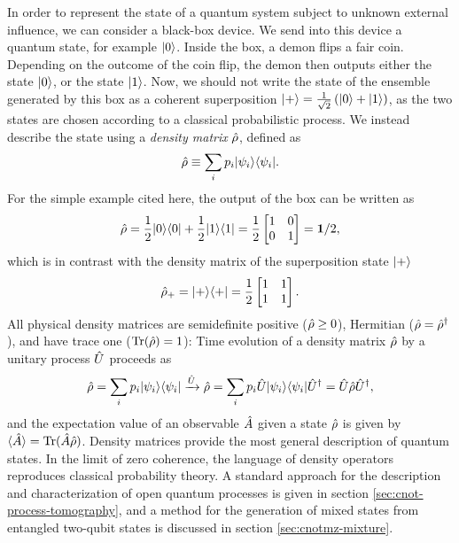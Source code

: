 In order to represent the state of a quantum system subject to unknown external influence, we can consider a black-box device. We send into this device a quantum state, for example $\mbox{$ | 0 \rangle $}$. Inside the box, a demon flips a fair coin. Depending on the outcome of the coin flip, the demon then outputs either the state $\mbox{$ | 0 \rangle $}$, or the state $\mbox{$ | 1 \rangle $}$. Now, we should not write the state of the ensemble generated by this box as a coherent superposition $\mbox{$ | + \rangle $} = \frac{1}{\sqrt{2}}\left(\mbox{$ | 0 \rangle $}+\mbox{$ | 1 \rangle $}\right)$, as the two states are chosen according to a classical probabilistic process. We instead describe the state using a \emph{density matrix} $\hat{\rho}$, defined as
\begin{equation}
    \hat{\rho} \equiv \sum_i p_i \mbox{$ | \psi_i \rangle $} \mbox{$ \langle \psi_i | $}.
\end{equation}
For the simple example cited here, the output of the box can be written as 
\begin{equation}
    \hat{\rho} = \frac{1}{2} \mbox{$ | 0 \rangle $}\mbox{$ \langle 0 | $} + \frac{1}{2} \mbox{$ | 1 \rangle $}\mbox{$ \langle 1 | $} =
    \frac{1}{2}
    \begin{bmatrix}
       1 & 0 \\
       0 & 1 
    \end{bmatrix} = \mathbf{1}/2,
\end{equation}
which is in contrast with the density matrix of the superposition state $\mbox{$ | + \rangle $}$
\begin{equation}
    \hat{\rho}_+ = \mbox{$ | + \rangle $} \mbox{$ \langle + | $} = \frac{1}{2} 
    \begin{bmatrix}
       1 & 1 \\
       1 & 1 
    \end{bmatrix} .
\end{equation}
All physical density matrices are semidefinite positive ($\hat{\rho} \ge 0$), Hermitian ($\hat{\rho} = \hat{\rho}^\dagger$), and have trace one ($\mathrm{Tr}(\hat{\rho}) = 1$):
Time evolution of a density matrix $\hat{\rho}$ by a unitary process $\hat{U}$ proceeds as
\begin{equation}
   \hat{\rho} = \sum_i p_i \mbox{$ | \psi_i \rangle $}\mbox{$ \langle \psi_i | $} \xrightarrow{\hat{U}}  
   \hat{\rho} = \sum_i p_i \hat{U} \mbox{$ | \psi_i \rangle $}\mbox{$ \langle \psi_i | $} \hat{U}^\dagger
   = \hat{U} \hat{\rho} \hat{U}^\dagger,
\end{equation}
and the expectation value of an observable $\hat{A}$ given a state $\hat{\rho}$ is given by
$\langle \hat{A} \rangle = \mathrm{Tr} ( \hat{A} \hat{\rho} )$.
Density matrices provide the most general description of quantum states. In the limit of zero coherence, the language of density operators reproduces classical probability theory. 
A standard approach for the description and characterization of open quantum processes is given in section \ref{sec:cnot-process-tomography}, and a method for the generation of mixed states from entangled two-qubit states is discussed in section \ref{sec:cnotmz-mixture}.


